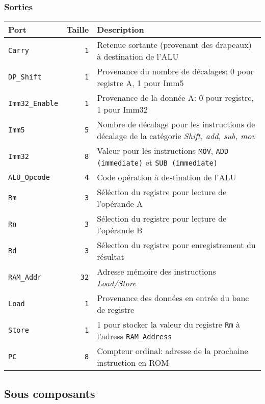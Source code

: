 \subsubsection{Sorties}

\begin{tabular}{|l|r|l|}
\hline 
\textbf{Port} & \textbf{Taille} & \textbf{Description}\\
\hline

\hline
\texttt{Carry}		&  \texttt{1} & Retenue sortante (provenant des drapeaux) à destination de l'ALU\\
\hline
\texttt{DP\_Shift}	&  \texttt{1} & Provenance du nombre de décalages: 0 pour registre A, 1 pour Imm5 \\
\hline
\texttt{Imm32\_Enable}	&  \texttt{1} & Provenance de la donnée A: 0 pour registre, 1 pour Imm32\\
\hline
\texttt{Imm5}		&  \texttt{5} & Nombre de décalage pour les instructions de décalage de la catégorie \textit{Shift, add, sub, mov}\\
\hline
\texttt{Imm32}		&  \texttt{8} & Valeur pour les instructions \texttt{MOV}, \texttt{ADD (immediate)} et \texttt{SUB (immediate)}\\
\hline
\texttt{ALU\_Opcode}	&  \texttt{4} & Code opération à destination de l'ALU\\
\hline
\texttt{Rm}		&  \texttt{3} & Séléction du registre pour lecture de l'opérande A\\
\hline
\texttt{Rn}		&  \texttt{3} & Sélection du registre pour lecture de l'opérande B\\
\hline
\texttt{Rd}		&  \texttt{3} & Sélection du registre pour enregistrement du résultat\\
\hline
\texttt{RAM\_Addr}	& \texttt{32} & Adresse mémoire des instructions \textit{Load/Store}\\
\hline
\texttt{Load}		&  \texttt{1} & Provenance des données en entrée du banc de registre\\
\hline
\texttt{Store}		&  \texttt{1} & 1 pour stocker la valeur du registre \texttt{Rm} à l'adress \texttt{RAM\_Address}\\
\hline
\texttt{PC}		&  \texttt{8} & Compteur ordinal: adresse de la prochaine instruction en ROM\\


\hline
\end{tabular}

\subsection{Sous composants}

